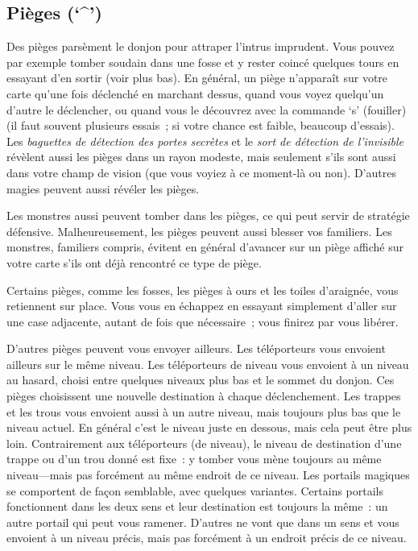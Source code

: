 \documentclass[titlepage]{article}
\begin{document}
\subsection{Pièges (`\textasciicircum{}')}



Des pièges parsèment le donjon pour attraper l'intrus imprudent.
Vous pouvez par exemple tomber soudain dans une fosse et y rester coincé
quelques tours en essayant d'en sortir (voir plus bas).
En général, un piège n'apparaît sur votre carte qu'une fois déclenché en
marchant dessus, quand vous voyez quelqu'un d'autre le déclencher, ou quand
vous le découvrez avec la commande `s' (fouiller) (il faut souvent
plusieurs essais~; si votre chance est faible, beaucoup d'essais).
Les \textit{baguettes de détection des portes secrètes} et le \textit{sort de
détection de l'invisible} révèlent aussi les pièges dans un rayon
modeste, mais seulement s'ils sont aussi dans votre champ de vision (que
vous voyiez à ce moment-là ou non).
D'autres magies peuvent aussi révéler les pièges.


Les monstres aussi peuvent tomber dans les pièges, ce qui peut servir de
stratégie défensive.
Malheureusement, les pièges peuvent aussi blesser vos familiers.
Les monstres, familiers compris, évitent en général d'avancer sur un
piège affiché sur votre carte s'ils ont déjà rencontré ce type de piège.


Certains pièges, comme les fosses, les pièges à ours et les toiles
d'araignée, vous retiennent sur place.
Vous vous en échappez en essayant simplement d'aller sur une case
adjacente, autant de fois que nécessaire~; vous finirez par vous libérer.


D'autres pièges peuvent vous envoyer ailleurs.
Les téléporteurs vous envoient ailleurs sur le même niveau.
Les téléporteurs de niveau vous envoient à un niveau au hasard, choisi
entre quelques niveaux plus bas et le sommet du donjon.
Ces pièges choisissent une nouvelle destination à chaque déclenchement.
Les trappes et les trous vous envoient aussi à un autre niveau, mais
toujours plus bas que le niveau actuel.
En général c'est le niveau juste en dessous, mais cela peut être plus
loin.
Contrairement aux téléporteurs (de niveau), le niveau de destination d'une
trappe ou d'un trou donné est fixe~: y tomber vous mène toujours au même
niveau---mais pas forcément au même endroit de ce niveau.
Les portails magiques se comportent de façon semblable, avec quelques
variantes.
Certains portails fonctionnent dans les deux sens et leur destination est
toujours la même~: un autre portail qui peut vous ramener.
D'autres ne vont que dans un sens et vous envoient à un niveau précis, mais
pas forcément à un endroit précis de ce niveau.
\end{document}
